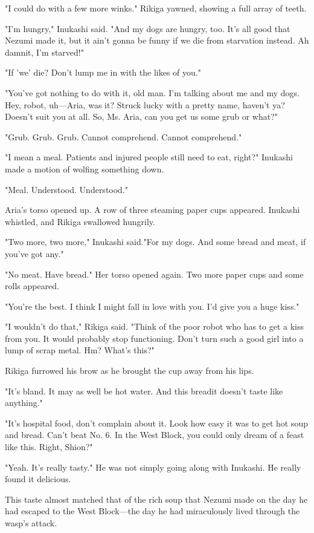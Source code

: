 "I could do with a few more winks." Rikiga yawned, showing a full array
of teeth.

"I'm hungry," Inukashi said. "And my dogs are hungry, too. It's all good
that Nezumi made it, but it ain't gonna be funny if we die from
starvation instead. Ah damnit, I'm starved!"

"If 'we' die? Don't lump me in with the likes of you."

"You've got nothing to do with it, old man. I'm talking about me and my
dogs. Hey, robot, uh---Aria, was it? Struck lucky with a pretty name,
haven't ya? Doesn't suit you at all. So, Ms. Aria, can you get us some
grub or what?"

{\sffamily "Grub. Grub. Grub. Cannot comprehend. Cannot comprehend."}

"I mean a meal. Patients and injured people still need to eat, right?"
Inukashi made a motion of wolfing something down.

{\sffamily "Meal. Understood. Understood."}

Aria's torso opened up. A row of three steaming paper cups appeared.
Inukashi whistled, and Rikiga swallowed hungrily.

"Two more, two more," Inukashi said."For my dogs. And some bread and
meat, if you've got any."

{\sffamily "No meat. Have bread."} Her torso opened again. Two more paper cups and
some rolls appeared.

"You're the best. I think I might fall in love with you. I'd give you a
huge kiss."

"I wouldn't do that," Rikiga said. "Think of the poor robot who has to
get a kiss from you. It would probably stop functioning. Don't turn such
a good girl into a lump of scrap metal. Hm? What's this?"

Rikiga furrowed his brow as he brought the cup away from his lips.

"It's bland. It may as well be hot water. And this bread\el it doesn't
taste like anything."

"It's hospital food, don't complain about it. Look how easy it was to
get hot soup and bread. Can't beat No. 6. In the West Block, you could
only dream of a feast like this. Right, Shion?"

"Yeah. It's really tasty." He was not simply going along with Inukashi.
He really found it delicious.

This taste almost matched that of the rich soup that Nezumi made on the
day he had escaped to the West Block---the day he had miraculously lived
through the wasp's attack.

